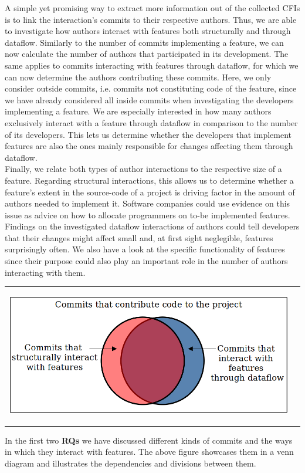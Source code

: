 A simple yet promising way to extract more information out of the collected CFIs is to link the interaction's commits to their respective authors.
Thus, we are able to investigate how authors interact with features both structurally and through dataflow.
Similarly to the number of commits implementing a feature, we can now calculate the number of authors that participated in its development.
The same applies to commits interacting with features through dataflow, for which we can now determine the authors contributing these commits.
Here, we only consider outside commits, i.e. commits not constituting code of the feature, since we have already considered all inside commits when investigating the developers implementing a feature.
We are especially interested in how many authors exclusively interact with a feature through dataflow in comparison to the number of its developers.
This lets us determine whether the developers that implement features are also the ones mainly responsible for changes affecting them through dataflow. \\
Finally, we relate both types of author interactions to the respective size of a feature.
Regarding structural interactions, this allows us to determine whether a feature's extent in the source-code of a project is driving factor in the amount of authors needed to implement it. 
Software companies could use evidence on this issue as advice on how to allocate programmers on to-be implemented features.
Findings on the investigated dataflow interactions of authors could tell developers that their changes might affect small and, at first sight neglegible, features surprisingly often.
We also have a look at the specific functionality of features since their purpose could also play an important role in the number of authors interacting with them.

\begin{center}
\begin{tabular}{cc}
\includegraphics[height=6cm]{gfx/Commits-of-a-Software-Project.png}
\end{tabular}
\end{center}
\textsf{
In the first two \textbf{RQs} we have discussed different kinds of commits and the ways in which they interact with features. 
The above figure showcases them in a venn diagram and illustrates the dependencies and divisions between them.
}

